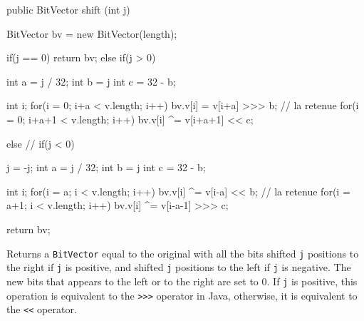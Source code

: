 \begin{htmlonly}
\end{htmlonly}
\begin{code}

   public BitVector shift (int j) \begin{hide} {
      BitVector bv = new BitVector(length);

      if(j == 0)
         return bv;
      else if(j > 0) {
         int a = j / 32;
         int b = j %
         int c = 32 - b;

         int i;
         for(i = 0; i+a < v.length; i++)
            bv.v[i] = v[i+a] >>> b;
         // la retenue
         for(i = 0; i+a+1 < v.length; i++)
            bv.v[i] ^= v[i+a+1] << c;
      } else // if(j < 0)
      {
         j = -j;
         int a = j / 32;
         int b = j %
         int c = 32 - b;

         int i;
         for(i = a; i < v.length; i++)
            bv.v[i] ^= v[i-a] << b;
         // la retenue
         for(i = a+1; i < v.length; i++)
            bv.v[i] ^= v[i-a-1] >>> c;
      }

      return bv;
   } \end{hide}
\end{code}
\begin{tabb} Returns a \texttt{BitVector} equal to the original with
  all the bits shifted \texttt{j} positions to the right if \texttt{j} is
  positive, and shifted \texttt{j} positions  to the left if \texttt{j} is negative.
  The new bits that appears to the left or to the right are set to 0.
  If \texttt{j} is positive, this operation is equivalent to the \texttt{>>>}
  operator in Java, otherwise, it is equivalent to the \texttt{<<} operator.
\end{tabb}
\begin{htmlonly}
\end{htmlonly}
